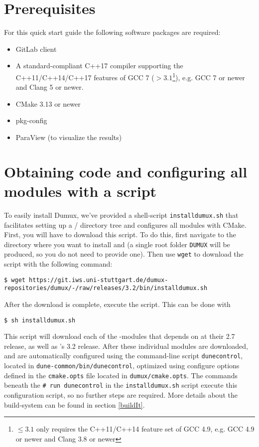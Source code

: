 \section{Prerequisites} \label{sec:prerequisites}
For this quick start guide the following software packages are required:
\begin{itemize}
\item GitLab client
\item A standard-compliant C++17 compiler supporting the C++11/C++14/C++17 features of GCC 7
(\Dumux $> 3.1$\footnote{\Dumux $\leq 3.1$ only requires the C++11/C++14 feature set of GCC 4.9,
e.g. GCC 4.9 or newer and Clang 3.8 or newer}), e.g. GCC 7 or newer and Clang 5 or newer.
\item CMake 3.13 or newer
\item pkg-config
\item ParaView (to visualize the results)
\end{itemize}

\section{Obtaining code and configuring all modules with a script}
To easily install Dumux, we've provided a shell-script \texttt{installdumux.sh} that facilitates
setting up a {\Dune}/{\Dumux} directory tree and configures all modules with CMake.
First, you will have to download this script. To do this, first navigate to the directory where you
want to install \Dumux and \Dune (a single root folder \texttt{DUMUX} will be produced, so you do
not need to provide one). Then use \texttt{wget} to download the script with the following command:
\begin{lstlisting}[style=Bash]
$ wget https://git.iws.uni-stuttgart.de/dumux-repositories/dumux/-/raw/releases/3.2/bin/installdumux.sh
\end{lstlisting}

After the download is complete, execute the script. This can be done with
\begin{lstlisting}[style=Bash]
$ sh installdumux.sh
\end{lstlisting}

This script will download each of the \Dune-modules that \Dumux depends on at their 2.7 release,
as well as \Dumux's 3.2 release. After these individual modules are downloaded, \Dune and \Dumux
are automatically configured using the command-line script \texttt{dunecontrol}, located in
\texttt{dune-common/bin/dunecontrol}, optimized using configure options defined in the \texttt{cmake.opts}
file located in \texttt{dumux/cmake.opts}. The commands beneath the \texttt{\# run dunecontrol} in
the \texttt{installdumux.sh} script execute this configuration script, so no further steps are required.
More details about the build-system can be found in section \ref{buildIt}.

